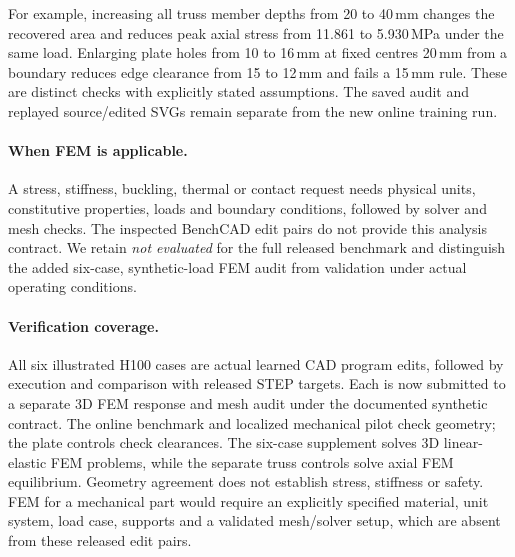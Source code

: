 For example, increasing all truss member depths from 20 to 40\,mm changes the recovered area and reduces peak axial stress from 11.861 to 5.930\,MPa under the same load. Enlarging plate holes from 10 to 16\,mm at fixed centres 20\,mm from a boundary reduces edge clearance from 15 to 12\,mm and fails a 15\,mm rule. These are distinct checks with explicitly stated assumptions. The saved audit and replayed source/edited SVGs remain separate from the new online training run.

\paragraph{When FEM is applicable.}
A stress, stiffness, buckling, thermal or contact request needs physical units, constitutive properties, loads and boundary conditions, followed by solver and mesh checks. The inspected BenchCAD edit pairs do not provide this analysis contract. We retain \emph{not evaluated} for the full released benchmark and distinguish the added six-case, synthetic-load FEM audit from validation under actual operating conditions.

\paragraph{Verification coverage.}
All six illustrated H100 cases are actual learned CAD program edits, followed by execution and comparison with released STEP targets. Each is now submitted to a separate 3D FEM response and mesh audit under the documented synthetic contract. The online benchmark and localized mechanical pilot check geometry; the plate controls check clearances. The six-case supplement solves 3D linear-elastic FEM problems, while the separate truss controls solve axial FEM equilibrium. Geometry agreement does not establish stress, stiffness or safety. FEM for a mechanical part would require an explicitly specified material, unit system, load case, supports and a validated mesh/solver setup, which are absent from these released edit pairs.
